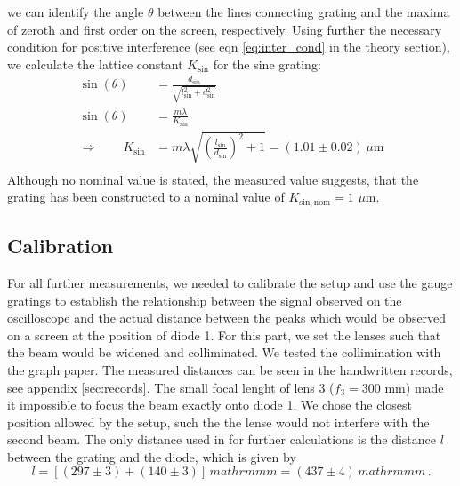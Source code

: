 we can identify the angle $\theta$ between the lines connecting grating and the maxima 
of zeroth and first order on the screen, respectively. Using further the 
necessary condition for positive interference (see eqn \eqref{eq:inter_cond} in the theory section), 
we calculate the lattice constant $K_\mathrm{sin}$ for the sine grating:
\begin{align}
    \sin(\theta)&= \frac{d_\mathrm{sin}}{\sqrt{l_\mathrm{sin}^2 + d_\mathrm{sin}^2}} \\
    \sin(\theta)&= \frac{m\lambda}{K_\mathrm{sin}} \\
    \Rightarrow \qquad 
    K_\mathrm{sin}    &= m \lambda\sqrt{\left(\frac{l_\mathrm{sin}}{d_\mathrm{sin}}\right)^2 + 1} 
        = (1.01 \pm 0.02) \, \mu\mathrm{m} \\
\end{align}
Although no nominal value is stated, the measured value suggests, that the grating has been 
constructed to a nominal value of $K_\mathrm{sin, nom} = 1$ $\mu$m. 

\subsection{Calibration}
For all further measurements, we needed to calibrate the setup and use the gauge gratings 
to establish the relationship between the signal observed on the oscilloscope and the 
actual distance between the peaks which would be observed on a screen at the position of diode 1. 
For this part, we set the lenses such that the beam would be widened and colliminated. We tested the collimination 
with the graph paper. The measured distances can be seen in the handwritten records, see appendix \ref{sec:records}.
The small focal lenght of lens 3 ($f_3 = 300$ mm) made it impossible to focus the beam exactly onto diode 1. We 
chose the closest position allowed by the setup, such the the lense would not interfere with the second beam. 
The only distance used in for further calculations is the distance $l$ between the grating and the diode, 
which is given by 
\begin{equation}
    l = \left[(297 \pm 3) + (140 \pm 3)\right] \, mathrm{mm}
    = (437 \pm 4) \, mathrm{mm} \, .
\end{equation}

